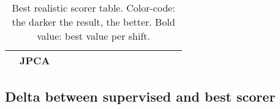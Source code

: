 \begin{table}[H]
\begin{tabular}{c|l|c|c|c|c|c|c|c|c|c|c|c|c|c|}
 & JPCA & \cellcolor{red!55}{0.23 ± 0.04} & \cellcolor{red!52}{0.21 ± 0.09} & \cellcolor{red!55}{0.18 ± 0.05} & \cellcolor{red!64}{0.21 ± 0.03} & \cellcolor{red!55}{0.19 ± 0.06} & \cellcolor{red!54}{0.18 ± 0.04} & \cellcolor{red!58}{0.16 ± 0.02} & \cellcolor{red!62}{0.16 ± 0.03} & \cellcolor{red!72}{0.23 ± 0.01} & \cellcolor{red!62}{0.17 ± 0.02} & \cellcolor{red!79}{0.12 ± 0.02} & \cellcolor{red!71}{0.23 ± 0.07} & \cellcolor{red!66}{0.19 ± 0.03} \\
\hline
\end{tabular}
\caption{Best realistic scorer table. Color-code: the darker the result, the better. Bold value: best value per shift.}
\end{table}

\subsection{Delta between supervised and best scorer}

